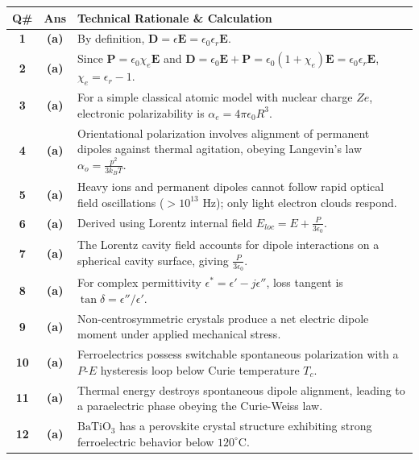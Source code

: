 {\small
\noindent\begin{tabularx}{\textwidth}{|c|c|X|}
\hline
\textbf{Q\#} & \textbf{Ans} & \textbf{Technical Rationale \& Calculation} \\
\hline
\textbf{1} & \textbf{(a)} & By definition, $\mathbf{D} = \epsilon \mathbf{E} = \epsilon_0 \epsilon_r \mathbf{E}$. \\ \hline
\textbf{2} & \textbf{(a)} & Since $\mathbf{P} = \epsilon_0 \chi_e \mathbf{E}$ and $\mathbf{D} = \epsilon_0 \mathbf{E} + \mathbf{P} = \epsilon_0(1+\chi_e)\mathbf{E} = \epsilon_0\epsilon_r\mathbf{E}$, $\chi_e = \epsilon_r - 1$. \\ \hline
\textbf{3} & \textbf{(a)} & For a simple classical atomic model with nuclear charge $Ze$, electronic polarizability is $\alpha_e = 4\pi\epsilon_0 R^3$. \\ \hline
\textbf{4} & \textbf{(a)} & Orientational polarization involves alignment of permanent dipoles against thermal agitation, obeying Langevin's law $\alpha_o = \frac{p^2}{3k_B T}$. \\ \hline
\textbf{5} & \textbf{(a)} & Heavy ions and permanent dipoles cannot follow rapid optical field oscillations ($>10^{13}\text{ Hz}$); only light electron clouds respond. \\ \hline
\textbf{6} & \textbf{(a)} & Derived using Lorentz internal field $E_{loc} = E + \frac{P}{3\epsilon_0}$. \\ \hline
\textbf{7} & \textbf{(a)} & The Lorentz cavity field accounts for dipole interactions on a spherical cavity surface, giving $\frac{P}{3\epsilon_0}$. \\ \hline
\textbf{8} & \textbf{(a)} & For complex permittivity $\epsilon^* = \epsilon' - j\epsilon''$, loss tangent is $\tan \delta = \epsilon'' / \epsilon'$. \\ \hline
\textbf{9} & \textbf{(a)} & Non-centrosymmetric crystals produce a net electric dipole moment under applied mechanical stress. \\ \hline
\textbf{10} & \textbf{(a)} & Ferroelectrics possess switchable spontaneous polarization with a $P$-$E$ hysteresis loop below Curie temperature $T_c$. \\ \hline
\textbf{11} & \textbf{(a)} & Thermal energy destroys spontaneous dipole alignment, leading to a paraelectric phase obeying the Curie-Weiss law. \\ \hline
\textbf{12} & \textbf{(a)} & $\text{BaTiO}_3$ has a perovskite crystal structure exhibiting strong ferroelectric behavior below $120^\circ\text{C}$. \\ \hline

\end{tabularx}}
